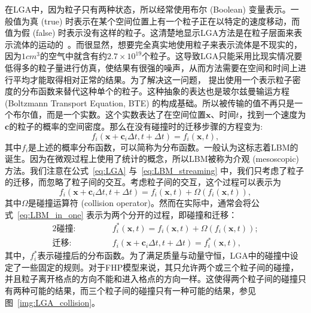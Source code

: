 在LGA中，因为粒子只有两种状态，所以经常使用布尔 (Boolean) 变量表示。一般值为真 (true) 时表示在某个空间位置上有一个粒子正在以特定的速度移动，而值为假 (false) 时表示没有这样的粒子。这清楚地显示LGA方法是在粒子层面来表示流体的运动的~\citep{wolf2004lattice}。而很显然，想要完全真实地使用粒子来表示流体是不现实的，因为$1cm^3$的空气中就含有约$2.7\times 10^{19}$个粒子。这导致LGA只能采用比现实情况要低得多的粒子量进行仿真，使结果有很强的噪声，从而方法需要在空间和时间上进行平均才能取得相对正常的结果。为了解决这一问题，\citet{PhysRevLett.61.2332} 提出使用一个表示粒子密度的分布函数来替代这种单个的粒子。这种抽象的表达也是玻尔兹曼输运方程 (Boltzmann Transport Equation, BTE) 的构成基础。所以被传输的值不再只是一个布尔值，而是一个实数。这个实数表达了在空间位置$\mathbf{x}$、时间$t$，找到一个速度为$\mathbf{c}$的粒子的概率的空间密度。那么在没有碰撞时的迁移步骤的方程变为:
\begin{equation}
    f_{i}(\mathbf{x}+\mathbf{c}_i \Delta t,t+\Delta t)=f_{i}(\mathbf{x},t),
    \label{eq:LBM_streaming}
\end{equation}
其中$f_{i}$是上述的概率分布函数，可以简称为分布函数。一般认为这标志着LBM的诞生。因为在微观过程上使用了统计的概念，所以LBM被称为介观 (mesoscopic) 方法。我们注意在公式~\ref{eq:LGA} 与~\ref{eq:LBM_streaming} 中，我们只考虑了粒子的迁移，而忽略了粒子间的交互。考虑粒子间的交互，这个过程可以表示为
\begin{equation}
    f_{i}(\mathbf{x}+\mathbf{c}_i \Delta t,t+\Delta t)=f_{i}(\mathbf{x},t)+\Omega(f_{i}(\mathbf{x},t)),
    \label{eq:LBM_in_one}
\end{equation}
其中$\Omega$是碰撞运算符 (collision operator)。然而在实际中，通常会将公式~\ref{eq:LBM_in_one} 表示为两个分开的过程，即碰撞和迁移：
\begin{alignat}{2}
\textbf{碰撞:} & \quad\quad &&f_i^*(\boldsymbol{x}, t) =f_i(\boldsymbol{x}, t)+\Omega\left(f_i(\boldsymbol{x}, t)\right); \\
\textbf{迁移:} & &&f_i\left(\boldsymbol{x}+\mathbf{c}_i \Delta t, t+\Delta t\right) =f_i^*(\boldsymbol{x}, t),\label{eq:LBM_streaming_in_one}
\end{alignat}
其中，$f_i^*$表示碰撞后的分布函数。为了满足质量与动量守恒，LGA中的碰撞中设定了一些固定的规则。对于FHP模型来说，其只允许两个或三个粒子间的碰撞，并且粒子离开格点的方向不能和进入格点的方向一样。这使得两个粒子间的碰撞只有两种可能的结果，而三个粒子间的碰撞只有一种可能的结果，参见图~\ref{img:LGA_collision}。

